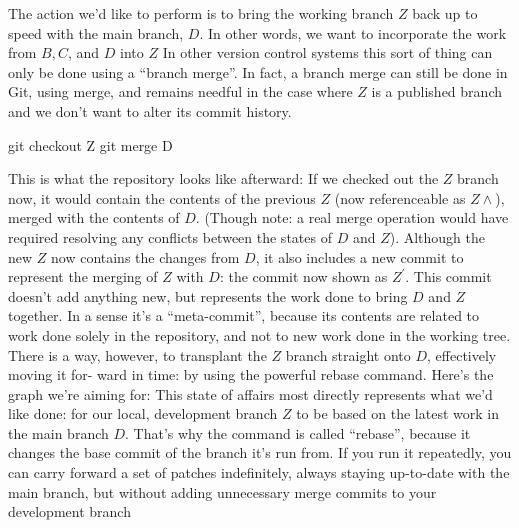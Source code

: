 \documentclass{report}
\begin{document}
\begin{itemize}
\begin{itemize}
            \end{itemize}
            The action we’d like to perform is to bring the working branch $Z$ back up to speed with the main branch, $D$. In other words, we want to incorporate the work from $B, C$, and $D$ into $Z$
            \bigbreak \noindent 
            In other version control systems this sort of thing can only be done using a “branch merge”. In fact, a branch merge can still be done in Git, using merge, and remains needful in the case where $Z$ is a published branch and we don’t want to alter its commit history. 
            \bigbreak \noindent 
            \begin{bashcode}
                git checkout Z
                git merge D
            \end{bashcode}
            \bigbreak \noindent 
            This is what the repository looks like afterward:
            \bigbreak \noindent 
            \bigbreak \noindent 
            If we checked out the $Z$ branch now, it would contain the contents of the previous $Z$ (now referenceable as $Z\land$), merged with the contents of $D$. (Though note: a real merge operation would have required resolving any conflicts between the states of $D$ and $Z$).
            \bigbreak \noindent 
            Although the new $Z$ now contains the changes from $D$, it also includes a new commit to represent the merging of $Z$ with $D$: the commit now shown as $Z^{\prime}$. This commit doesn’t add anything new, but represents the work done to bring $D$ and $Z$ together. In a sense it’s a “meta-commit”, because its contents are related to work done solely in the repository, and not to new work done in the working tree.
            \bigbreak \noindent 
            There is a way, however, to transplant the $Z$ branch straight onto $D$, effectively moving it for- ward in time: by using the powerful rebase command. Here’s the graph we’re aiming for:
            \bigbreak \noindent 
            \bigbreak \noindent 
            This state of affairs most directly represents what we’d like done: for our local, development branch $Z$ to be based on the latest work in the main branch $D$. That’s why the command is called “rebase”, because it changes the base commit of the branch it’s run from. If you run it repeatedly, you can carry forward a set of patches indefinitely, always staying up-to-date with the main branch, but without adding unnecessary merge commits to your development branch
            \bigbreak \noindent 
            \begin{bashcode}

\end{bashcode}
\end{itemize}
\end{document}
